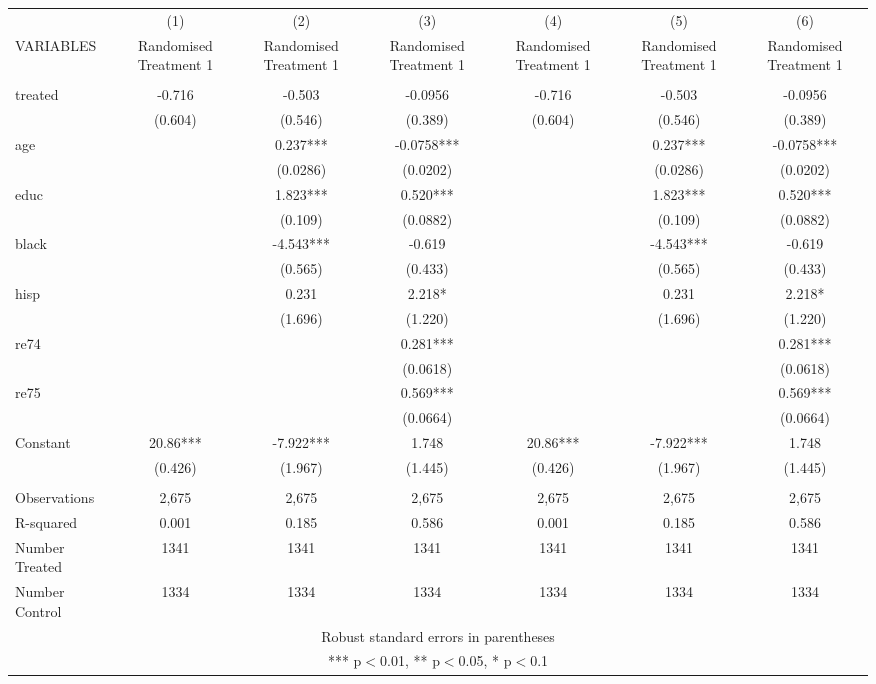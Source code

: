 \documentclass[]{article}
\begin{document}
\begin{tabular}{lcccccc} \hline
 & (1) & (2) & (3) & (4) & (5) & (6) \\
VARIABLES & Randomised Treatment 1 & Randomised Treatment 1 & Randomised Treatment 1 & Randomised Treatment 1 & Randomised Treatment 1 & Randomised Treatment 1 \\ \hline
 &  &  &  &  &  &  \\
treated & -0.716 & -0.503 & -0.0956 & -0.716 & -0.503 & -0.0956 \\
 & (0.604) & (0.546) & (0.389) & (0.604) & (0.546) & (0.389) \\
age &  & 0.237*** & -0.0758*** &  & 0.237*** & -0.0758*** \\
 &  & (0.0286) & (0.0202) &  & (0.0286) & (0.0202) \\
educ &  & 1.823*** & 0.520*** &  & 1.823*** & 0.520*** \\
 &  & (0.109) & (0.0882) &  & (0.109) & (0.0882) \\
black &  & -4.543*** & -0.619 &  & -4.543*** & -0.619 \\
 &  & (0.565) & (0.433) &  & (0.565) & (0.433) \\
hisp &  & 0.231 & 2.218* &  & 0.231 & 2.218* \\
 &  & (1.696) & (1.220) &  & (1.696) & (1.220) \\
re74 &  &  & 0.281*** &  &  & 0.281*** \\
 &  &  & (0.0618) &  &  & (0.0618) \\
re75 &  &  & 0.569*** &  &  & 0.569*** \\
 &  &  & (0.0664) &  &  & (0.0664) \\
Constant & 20.86*** & -7.922*** & 1.748 & 20.86*** & -7.922*** & 1.748 \\
 & (0.426) & (1.967) & (1.445) & (0.426) & (1.967) & (1.445) \\
 &  &  &  &  &  &  \\
Observations & 2,675 & 2,675 & 2,675 & 2,675 & 2,675 & 2,675 \\
R-squared & 0.001 & 0.185 & 0.586 & 0.001 & 0.185 & 0.586 \\
Number Treated & 1341 & 1341 & 1341 & 1341 & 1341 & 1341 \\
 Number Control & 1334 & 1334 & 1334 & 1334 & 1334 & 1334 \\ \hline
\multicolumn{7}{c}{ Robust standard errors in parentheses} \\
\multicolumn{7}{c}{ *** p$<$0.01, ** p$<$0.05, * p$<$0.1} \\
\end{tabular}
\end{document}

